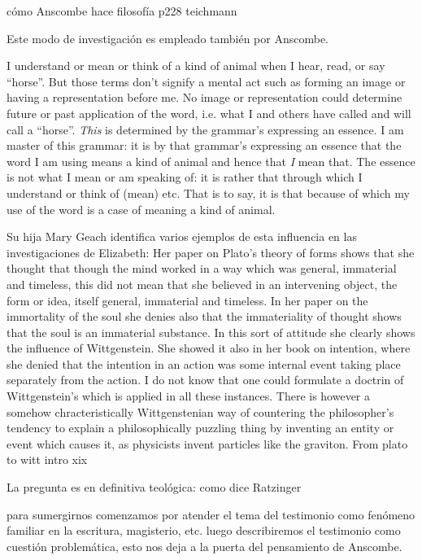 cómo Anscombe hace filosofía p228 teichmann

Este modo de investigación es empleado también por Anscombe.

I understand or mean or think of a kind of animal when I hear, read, or say
``horse''. But those terms don't signify a mental act such as forming an image
or having a representation before me. No image or representation could determine
future or past application of the word, i.e. what I and others have called and
will call a ``horse''. \emph{This} is determined by the grammar's expressing an
essence. I am master of this grammar: it is by that grammar's expressing an
essence that the word I am using means a kind of animal and hence that \emph{I}
mean that. The essence is not what I mean or am speaking of: it is rather that
through which I understand or think of (mean) etc. That is to say, it is that
because of which my use of the word is a case of meaning a kind of animal.

Su hija Mary Geach
identifica varios ejemplos de esta influencia en las investigaciones de
Elizabeth:
Her paper on Plato's theory of forms shows that she thought that though the mind
worked in a way which was general, immaterial and timeless, this did not mean
that she believed in an intervening object, the form or idea, itself general,
immaterial and timeless. In her paper on the immortality of the soul she denies
also that the immateriality of thought shows that the soul is an immaterial
substance. In this sort of attitude she clearly shows the influence of
Wittgenstein. She showed it also in her book on intention, where she denied that
the intention in an action was some internal event taking place separately from
the action. I do not know that one could formulate a doctrin of Wittgenstein's
which is applied in all these instances. There is however a somehow
chracteristically Wittgenstenian way of countering the philosopher's tendency to
explain a philosophically puzzling thing by inventing an entity or event which
causes it, as physicists invent particles like the graviton. From plato to witt
intro xix

La pregunta es en
definitiva teológica: como dice Ratzinger


para sumergirnos comenzamos por atender el tema del testimonio como fenómeno
familiar en la escritura, magisterio, etc.
luego describiremos el testimonio como cuestión problemática, esto nos deja a la
puerta del pensamiento de Anscombe.
